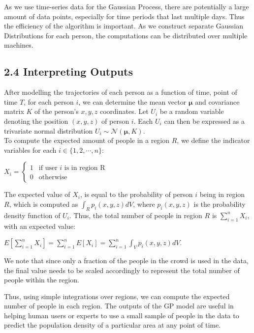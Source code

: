 \documentclass[letterpaper]{article}
\begin{document}
As we use time-series data for the Gaussian Process, there are potentially a large amount of data points, especially for time periods that last multiple days. Thus the efficiency of the algorithm is important. As we construct separate Gaussian Distributions for each person, the computations can be distributed over multiple machines.

\subsection{2.4  Interpreting Outputs}

After modelling the trajectories of each person as a function of time, point of time $T$, for each person $i$, we can determine the mean vector $\boldsymbol{\mu}$ and covariance matrix $K$ of the person's $x,y,z$ coordinates. Let $U_i$ be a random variable denoting the position $(x,y,z)$ of person $i$. Each $U_i$ can then be expressed as a trivariate normal distribution $U_i \sim \mathcal{N}(\boldsymbol{\mu},K)$.\\

To compute the expected amount of people in a region $R$, we define the indicator variables for each $i \in \{1,2,\cdots,n\}$:
\begin{center}
$X_i =
\begin{cases}
    1 &\text{if user }i\text{ is in region R}\\
    0 &\text{otherwise}
\end{cases}$
\end{center}
The expected value of $X_i$, is equal to the probability of person $i$ being in region $R$, which is computed as $\int_R p_i(x,y,z)dV$, where $p_i(x,y,z)$ is the probability density function of $U_i$. Thus, the total number of people in region $R$ is $\sum_{i=1}^n X_i$, with an expected value:
\begin{center}
$\displaystyle E[\sum_{i=1}^n X_i] = \sum_{i=1}^n E[X_i] = \sum_{i=1}^n \int_V p_i(x,y,z)dV$.
\end{center}

We note that since only a fraction of the people in the crowd is used in the data, the final value needs to be scaled accordingly to represent the total number of people within the region.

Thus, using simple integrations over regions, we can compute the expected number of people in each region. The outputs of the GP model are useful in helping human users or experts to use a small sample of people in the data to predict the population density of a particular area at any point of time. \\
\end{document}
